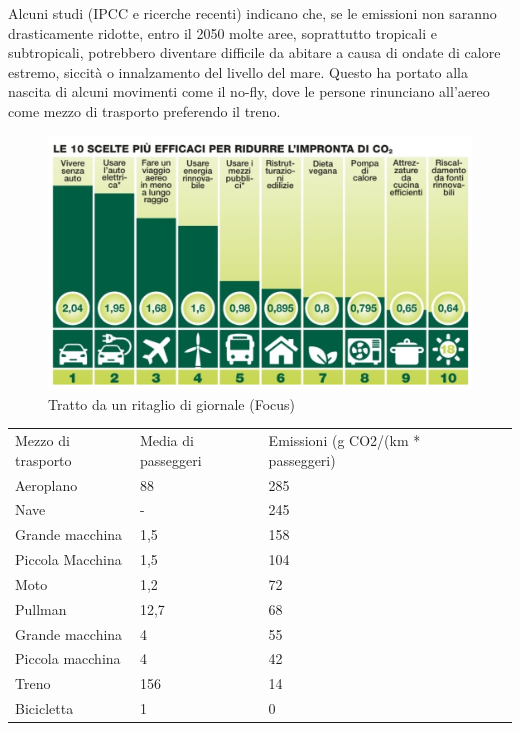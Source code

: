 \documentclass[12pt]{book} %
\begin{document}
Alcuni studi (IPCC e ricerche recenti) indicano che, se le emissioni non saranno drasticamente ridotte, entro il 2050 molte aree, soprattutto tropicali e subtropicali, potrebbero diventare difficile da abitare a causa di ondate di calore estremo, siccità o innalzamento del livello del mare. Questo ha portato alla nascita di alcuni movimenti come il no-fly, dove le persone rinunciano all'aereo come mezzo di trasporto preferendo il treno.

\needspace{4cm}
\begin{figure}[H]
  \centering
  \includegraphics[width=0.95\linewidth]{images/Libro-img019.jpg}
  \caption{Tratto da un ritaglio di giornale (Focus)}
\end{figure}

\begin{table}[]
\begin{tabular}{lllll}
Mezzo di trasporto & Media di passeggeri & Emissioni (g CO2/(km * passeggeri) & & \\
Aeroplano & 88 & 285 & & \\
Nave & - & 245 & & \\
Grande macchina & 1,5 & 158 & & \\
Piccola Macchina & 1,5 & 104 & & \\
Moto & 1,2 & 72 & & \\
Pullman & 12,7 & 68 & & \\
Grande macchina & 4 & 55 & & \\
Piccola macchina & 4 & 42 & & \\
Treno & 156 & 14 & & \\
Bicicletta & 1 & 0 & & 
\end{tabular}
\end{table}
\end{document}
